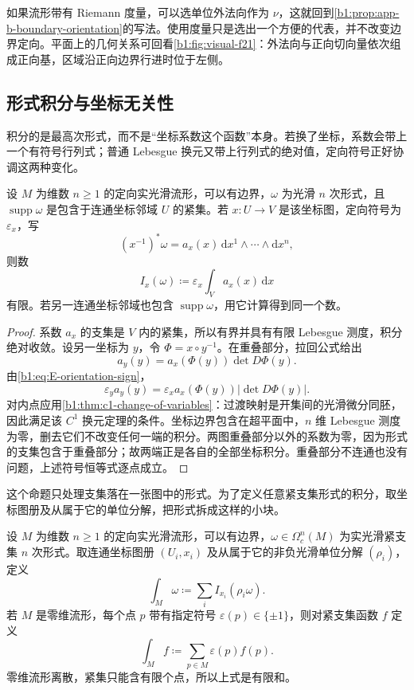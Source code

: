 如果流形带有 Riemann 度量，可以选单位外法向作为 \(\nu\)，这就回到\cref{b1:prop:app-b-boundary-orientation}的写法。使用度量只是选出一个方便的代表，并不改变边界定向。平面上的几何关系可回看\cref{b1:fig:visual-f21}：外法向与正向切向量依次组成正向基，区域沿正向边界行进时位于左侧。

\subsection{形式积分与坐标无关性}
\label{b1:subsec:E10402}

积分的是最高次形式，而不是“坐标系数这个函数”本身。若换了坐标，系数会带上一个有符号行列式；普通 Lebesgue 换元又带上行列式的绝对值，定向符号正好协调这两种变化。

\begin{proposition}\label{b1:prop:E-chart-integral}
设 \(M\) 为维数 \(n\geq1\) 的定向实光滑流形，可以有边界，\(\omega\) 为光滑 \(n\) 次形式，且 \(\operatorname{supp}\omega\) 是包含于连通坐标邻域 \(U\) 的紧集。若 \(x:U\longrightarrow V\) 是该坐标图，定向符号为 \(\varepsilon_x\)，写
\[
 (x^{-1})^*\omega
   =a_x(x)\,\mathrm dx^1\wedge\cdots\wedge\mathrm dx^n,
\]
则数
\[
 I_x(\omega)\coloneqq\varepsilon_x\int_Va_x(x)\,\mathrm dx
\]
有限。若另一连通坐标邻域也包含 \(\operatorname{supp}\omega\)，用它计算得到同一个数。
\end{proposition}
\begin{proof}
系数 \(a_x\) 的支集是 \(V\) 内的紧集，所以有界并具有有限 Lebesgue 测度，积分绝对收敛。设另一坐标为 \(y\)，令 \(\Phi=x\circ y^{-1}\)。在重叠部分，拉回公式给出
\[
 a_y(y)=a_x(\Phi(y))\det D\Phi(y).
\]
由\eqref{b1:eq:E-orientation-sign}，
\[
 \varepsilon_y a_y(y)
  =\varepsilon_x a_x(\Phi(y))|\det D\Phi(y)|.
\]
对内点应用\cref{b1:thm:c1-change-of-variables}：过渡映射是开集间的光滑微分同胚，因此满足该 \(C^1\) 换元定理的条件。坐标边界包含在超平面中，\(n\) 维 Lebesgue 测度为零，删去它们不改变任何一端的积分。两图重叠部分以外的系数为零，因为形式的支集包含于重叠部分；故两端正是各自的全部坐标积分。重叠部分不连通也没有问题，上述符号恒等式逐点成立。
\end{proof}

这个命题只处理支集落在一张图中的形式。为了定义任意紧支集形式的积分，取坐标图册及从属于它的单位分解，把形式拆成这样的小块。

\begin{definition}\label{b1:def:E-integral}
设 \(M\) 为维数 \(n\geq1\) 的定向实光滑流形，可以有边界，\(\omega\in\Omega_c^n(M)\) 为实光滑紧支集 \(n\) 次形式。取连通坐标图册 \((U_i,x_i)\) 及从属于它的非负光滑单位分解 \((\rho_i)\)，定义
\begin{equation}\label{b1:eq:E-manifold-integral}
 \int_M\omega\coloneqq\sum_i I_{x_i}(\rho_i\omega).
\end{equation}
若 \(M\) 是零维流形，每个点 \(p\) 带有指定符号 \(\varepsilon(p)\in\{\pm1\}\)，则对紧支集函数 \(f\) 定义
\[
 \int_Mf\coloneqq\sum_{p\in M}\varepsilon(p)f(p).
\]
零维流形离散，紧集只能含有限个点，所以上式是有限和。
\end{definition}

